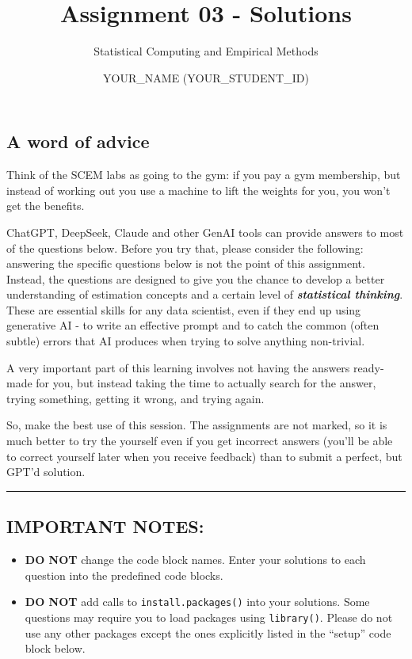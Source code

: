 \documentclass[]{article}
\title{Assignment 03 - Solutions}
\subtitle{Statistical Computing and Empirical Methods}
\author{YOUR\_NAME (YOUR\_STUDENT\_ID)}
\date{}
\providecommand{\tightlist}{%
  \setlength{\itemsep}{0pt}\setlength{\parskip}{0pt}}
\begin{document}
\maketitle

\hypertarget{a-word-of-advice}{%
\subsection{A word of advice}\label{a-word-of-advice}}

Think of the SCEM labs as going to the gym: if you pay a gym membership,
but instead of working out you use a machine to lift the weights for
you, you won't get the benefits.

ChatGPT, DeepSeek, Claude and other GenAI tools can provide answers to
most of the questions below. Before you try that, please consider the
following: answering the specific questions below is not the point of
this assignment. Instead, the questions are designed to give you the
chance to develop a better understanding of estimation concepts and a
certain level of \emph{\textbf{statistical thinking}}. These are
essential skills for any data scientist, even if they end up using
generative AI - to write an effective prompt and to catch the common
(often subtle) errors that AI produces when trying to solve anything
non-trivial.

A very important part of this learning involves not having the answers
ready-made for you, but instead taking the time to actually search for
the answer, trying something, getting it wrong, and trying again.

So, make the best use of this session. The assignments are not marked,
so it is much better to try the yourself even if you get incorrect
answers (you'll be able to correct yourself later when you receive
feedback) than to submit a perfect, but GPT'd solution.

\begin{center}\rule{0.5\linewidth}{0.5pt}\end{center}

\hypertarget{important-notes}{%
\subsection{IMPORTANT NOTES:}\label{important-notes}}

\begin{itemize}
\tightlist
\item
  \textbf{DO NOT} change the code block names. Enter your solutions to
  each question into the predefined code blocks.
\item
  \textbf{DO NOT} add calls to \texttt{install.packages()} into your
  solutions. Some questions may require you to load packages using
  \texttt{library()}. Please do not use any other packages except the
  ones explicitly listed in the ``setup'' code block below.
\end{itemize}
\end{document}
